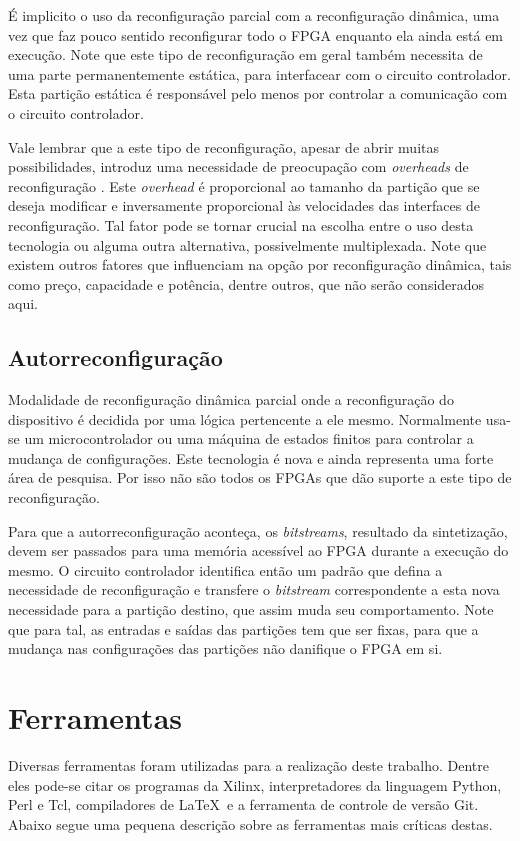 \documentclass[11pt,a4paper,oneside]{book}
\begin{document}
É implicito o uso da reconfiguração parcial com a reconfiguração dinâmica, uma vez que faz pouco sentido reconfigurar todo o FPGA enquanto ela ainda está em execução.
Note que este tipo de reconfiguração em geral também necessita de uma parte permanentemente est\'atica, para interfacear com o circuito controlador.
Esta parti\c{c}\~ao est\'atica \'e respons\'avel pelo menos por controlar a comunica\c{c}\~ao com o circuito controlador.

Vale lembrar que a este tipo de reconfiguração, apesar de abrir muitas possibilidades, introduz uma necessidade de preocupação com \textit{overheads} de reconfiguração \cite{Hauck2007}.
Este \textit{overhead} é proporcional ao tamanho da partição que se deseja modificar e inversamente proporcional às velocidades das interfaces de reconfiguração.
Tal fator pode se tornar crucial na escolha entre o uso desta tecnologia ou alguma outra alternativa, possivelmente multiplexada.
Note que existem outros fatores que influenciam na opção por reconfiguração dinâmica, tais como preço, capacidade e potência, dentre outros, que não serão considerados aqui.

\subsection{Autorreconfigura\c{c}\~ao}
Modalidade de reconfigura\c{c}\~ao din\^amica parcial onde a reconfigura\c{c}\~ao do dispositivo \'e decidida por uma l\'ogica pertencente a ele mesmo.
Normalmente usa-se um microcontrolador ou uma m\'aquina de estados finitos para controlar a mudan\c{c}a de configura\c{c}\~oes.
Este tecnologia \'e nova e ainda representa uma forte \'area de pesquisa.
Por isso n\~ao s\~ao todos os FPGAs que d\~ao suporte a este tipo de reconfigura\c{c}\~ao.

Para que a autorreconfigura\c{c}\~ao aconte\c{c}a, os \textit{bitstreams}, resultado da sintetiza\c{c}\~ao, devem ser passados para uma mem\'oria acess\'i­vel ao FPGA durante a execu\c{c}\~ao do mesmo.
O circuito controlador identifica ent\~ao um padr\~ao que defina a necessidade de reconfigura\c{c}\~ao e transfere o \textit{bitstream} correspondente a esta nova necessidade para a parti\c{c}\~ao destino, que assim muda seu comportamento.
Note que para tal, as entradas e sa\'i­das das parti\c{c}\~oes tem que ser fixas, para que a mudan\c{c}a nas configura\c{c}\~oes das parti\c{c}\~oes n\~ao danifique o FPGA em si.


\section{Ferramentas}
Diversas ferramentas foram utilizadas para a realização deste trabalho.
Dentre eles pode-se citar os programas da Xilinx, interpretadores da linguagem Python, Perl e Tcl, compiladores de \LaTeX~e a ferramenta de controle de versão Git.
Abaixo segue uma pequena descrição sobre as ferramentas mais críticas destas.
\end{document}
